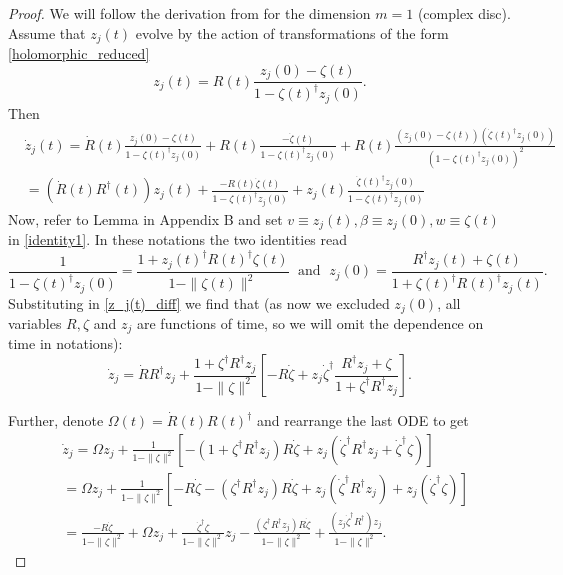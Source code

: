 \documentclass{article}
\theoremstyle{plain}%
\theoremstyle{definition}
\theoremstyle{remark}
\theoremstyle{prop}
\begin{document}
\begin{proof}

We will follow the derivation from \cite{CEM} for the dimension $m=1$ (complex disc). Assume that $z_j(t)$ evolve by the action of transformations of the form \eqref{holomorphic_reduced}
\begin{equation}
\label{z_j(t)}
z_j(t) = R(t) \frac{z_j(0) - \zeta(t)}{1 - \zeta(t)^\dagger z_j(0)}.
\end{equation}
Then
\begin{equation}
\label{z_j(t)_diff}
\begin{split}
& \dot z_j(t) = \dot R(t) \frac{z_j(0)-\zeta(t)}{1 - \zeta(t)^\dagger z_j(0)} + R(t) \frac{- \dot \zeta(t)}{1 - \zeta(t)^\dagger z_j(0)} + R(t) \frac{(z_j(0)-\zeta(t))(\dot \zeta(t)^\dagger z_j(0))}{(1 - \zeta(t)^\dagger z_j(0))^2} \\
& = (\dot R(t) R^\dagger(t)) z_j(t) + \frac{-R(t) \dot \zeta(t)}{1 - \zeta(t)^\dagger z_j(0)} + z_j(t) \frac{\dot \zeta(t)^\dagger z_j(0)}{1 - \zeta(t)^\dagger z_j(0)}
\end{split}
\end{equation}
Now, refer to Lemma in Appendix B and set $v \equiv z_j(t), \beta \equiv z_j(0), w \equiv \zeta(t)$ in \eqref{identity1}. In these notations the two identities read
$$
\frac{1}{1 - \zeta(t)^\dagger z_j(0)} = \frac{1 + z_j(t)^\dagger R(t)^\dagger \zeta(t)}{1 - \| \zeta(t) \|^2} \; \mbox{   and  } \;
z_j(0) = \frac{R^\dagger z_j(t) + \zeta(t)}{1 + \zeta(t)^\dagger R(t)^\dagger z_j(t)}.
$$
Substituting in \eqref{z_j(t)_diff} we find that (as now we excluded $z_j(0)$, all variables $R, \zeta$ and $z_j$ are functions of time, so we will omit the dependence on time in notations):
\begin{equation}
\label{z_j_ODE_1}
\dot z_j = \dot R R^\dagger z_j + \frac{1 + \zeta^\dagger R^\dagger z_j}{1 - \| \zeta \|^2} \left[ - R \dot \zeta + z_j \dot \zeta^\dagger \frac{R^\dagger z_j + \zeta}{1 + \zeta^\dagger R^\dagger z_j} \right].
\end{equation}

Further, denote $\Omega(t) = \dot R(t) R(t)^\dagger$ and rearrange the last ODE to get
\begin{equation}
\label{z_j_ODE_2}
\begin{split}
& \dot z_j = \Omega z_j + \frac{1}{1 - \| \zeta \|^2} [-(1 + \zeta^\dagger R^\dagger z_j)R \dot \zeta + z_j (\dot \zeta^\dagger R^\dagger z_j + \dot \zeta^\dagger \zeta) ] \\
& = \Omega z_j + \frac{1}{1 - \| \zeta \|^2} [-R \dot \zeta - (\zeta^\dagger R^\dagger z_j)R \dot \zeta + z_j(\dot \zeta^\dagger R^\dagger z_j) + z_j (\dot \zeta^\dagger \zeta)] \\
& = \frac{-R \dot \zeta}{1 - \| \zeta \|^2} + \Omega z_j + \frac{\dot \zeta^\dagger \zeta}{1 - \| \zeta \|^2} z_j - \frac{(\zeta^\dagger R^\dagger z_j) R \dot \zeta}{1 - \| \zeta \|^2} + \frac{(z_j \dot \zeta^\dagger R^\dagger) z_j}{1-\| \zeta \|^2}.
\end{split}
\end{equation}


\end{proof}
\end{document}
